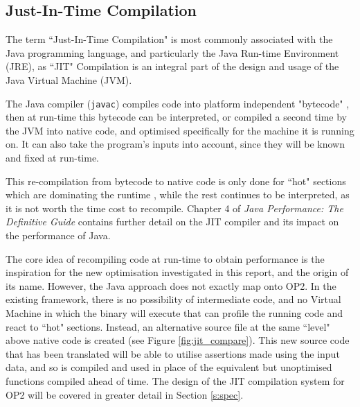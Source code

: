 \subsection{Just-In-Time Compilation}
\label{ss:rw_JIT}

The term ``Just-In-Time Compilation" is most commonly associated with the Java programming language, and particularly the Java Run-time Environment (JRE), as ``JIT" Compilation is an integral part of the design and usage of the Java Virtual Machine (JVM).

\par The Java compiler (\verb|javac|) compiles code into platform independent "bytecode" \cite{javac}, then at run-time this bytecode can be interpreted, or compiled a second time by the JVM into native code, and optimised specifically for the machine it is running on. It can also take the program's inputs into account, since they will be known and fixed at run-time.
\par
This re-compilation from bytecode to native code is only done for ``hot" sections which are dominating the runtime \cite{javac}, while the rest continues to be interpreted, as it is not worth the time cost to recompile. Chapter 4 of \textit{Java Performance: The Definitive Guide} \cite{javaPerf} contains further detail on the JIT compiler and its impact on the performance of Java.
\par
The core idea of recompiling code at run-time to obtain performance is the inspiration for the new optimisation investigated in this report, and the origin of its name. However, the Java approach does not exactly map onto OP2. In the existing framework, there is no possibility of intermediate code, and no Virtual Machine in which the binary will execute that can profile the running code and react to ``hot" sections. Instead, an alternative source file at the same ``level" above native code is created (see Figure \ref{fig:jit_compare}). This new source code that has been translated will be able to utilise assertions made using the input data, and so is compiled and used in place of the equivalent but unoptimised functions compiled ahead of time. The design of the JIT compilation system for OP2 will be covered in greater detail in Section \ref{s:spec}.

